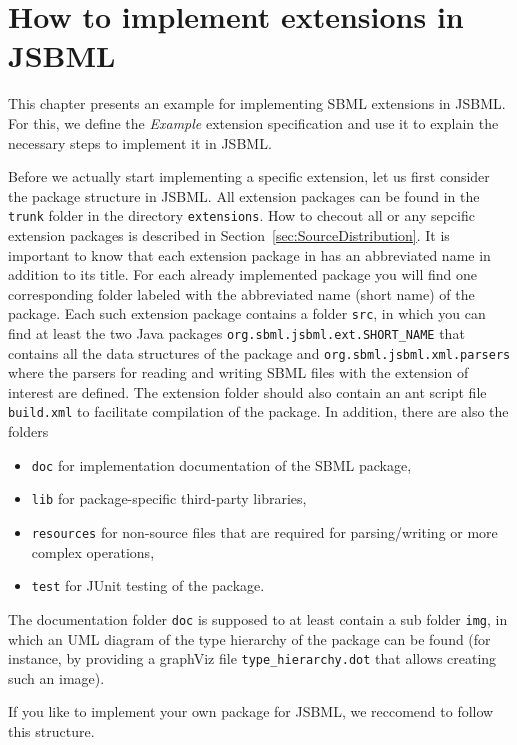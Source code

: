 \chapter{How to implement extensions in JSBML}
\label{sec:howToExtension}

This chapter presents an example for implementing SBML extensions in JSBML.
For this, we define the \emph{Example} extension specification and use it to
explain the necessary steps to implement it in JSBML.

Before we actually start implementing a specific extension, let us first
consider the package structure in JSBML. All extension packages can be found in
the \texttt{trunk} folder in the directory \texttt{extensions}. How to checout
all or any sepcific extension packages is described in
Section~\vref{sec:SourceDistribution}. It is important to know that each
extension package in \SBML{} has an abbreviated name in addition to its title.
For each already implemented package you will find one corresponding folder
labeled with the abbreviated name (short name) of the package. Each such
extension package contains a folder \texttt{src}, in which you can find at
least the two Java packages \texttt{org.sbml.jsbml.ext.SHORT\_NAME} that
contains all the data structures of the package and \texttt{org.sbml.jsbml.xml.parsers}
where the parsers for reading and writing SBML files with the extension of
interest are defined. The extension folder should also contain an ant script
file \texttt{build.xml} to facilitate compilation of the package.
In addition, there are also the folders
\begin{itemize}
  \item \texttt{doc} for implementation documentation of the SBML package, 
  \item \texttt{lib} for package-specific third-party libraries, 
  \item \texttt{resources} for non-source files that are required for
  parsing/writing or more complex operations,
  \item \texttt{test} for JUnit testing of the package.
\end{itemize}
The documentation folder \texttt{doc} is supposed to at least contain a sub
folder \texttt{img}, in which an UML diagram of the type hierarchy of the
package can be found (for instance, by providing a
graphViz file \texttt{type\_hierarchy.dot} that allows creating such an image).

If you like to implement your own package for JSBML, we reccomend to follow this
structure.

